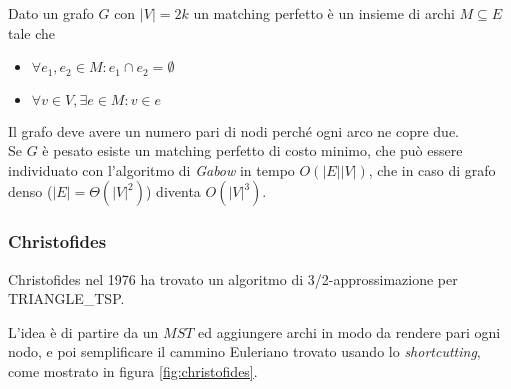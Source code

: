 \begin{definition}
    \label{def:matchingperfetto}
    Dato un grafo $G$ con $|V| = 2k$ un matching perfetto è un insieme di archi $M \subseteq E$ tale che
    \begin{itemize}
        \item $\forall e_1, e_2 \in M : e_1 \cap e_2 = \emptyset$
        \item $\forall v \in V, \exists e \in M : v \in e$
    \end{itemize}
\end{definition}
Il grafo deve avere un numero pari di nodi perché ogni arco ne copre due.
\\
Se $G$ è pesato esiste un matching perfetto di costo minimo, che può essere individuato con l'algoritmo di \emph{Gabow} in tempo $
O(|E||V|)
$, che in caso di grafo denso ($
|E| = \Theta (|V|^2)
$) diventa $
O(|V|^3)
$.

\subsubsection{Christofides}

Christofides nel 1976 \cite{Chr76} ha trovato un algoritmo di 3/2-approssimazione per TRIANGLE\_TSP.

L'idea è di partire da un $MST$ ed aggiungere archi in modo da rendere pari ogni nodo, e poi semplificare il cammino Euleriano trovato usando lo \emph{shortcutting}, come mostrato in figura \ref{fig:christofides}.

